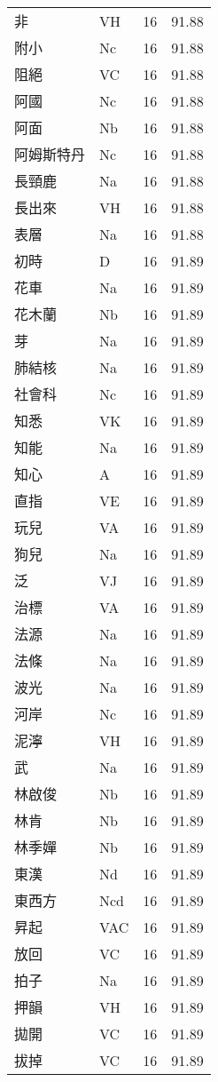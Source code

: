 \documentclass[twocolumn]{book}
\begin{document}
\begin{supertabular}{llrr}
非 & VH & 16 &  91.88\\
附小 & Nc & 16 &  91.88\\
阻絕 & VC & 16 &  91.88\\
阿國 & Nc & 16 &  91.88\\
阿面 & Nb & 16 &  91.88\\
阿姆斯特丹 & Nc & 16 &  91.88\\
長頸鹿 & Na & 16 &  91.88\\
長出來 & VH & 16 &  91.88\\
表層 & Na & 16 &  91.88\\
初時 & D & 16 &  91.89\\
花車 & Na & 16 &  91.89\\
花木蘭 & Nb & 16 &  91.89\\
芽 & Na & 16 &  91.89\\
肺結核 & Na & 16 &  91.89\\
社會科 & Nc & 16 &  91.89\\
知悉 & VK & 16 &  91.89\\
知能 & Na & 16 &  91.89\\
知心 & A & 16 &  91.89\\
直指 & VE & 16 &  91.89\\
玩兒 & VA & 16 &  91.89\\
狗兒 & Na & 16 &  91.89\\
泛 & VJ & 16 &  91.89\\
治標 & VA & 16 &  91.89\\
法源 & Na & 16 &  91.89\\
法條 & Na & 16 &  91.89\\
波光 & Na & 16 &  91.89\\
河岸 & Nc & 16 &  91.89\\
泥濘 & VH & 16 &  91.89\\
武 & Na & 16 &  91.89\\
林啟俊 & Nb & 16 &  91.89\\
林肯 & Nb & 16 &  91.89\\
林季嬋 & Nb & 16 &  91.89\\
東漢 & Nd & 16 &  91.89\\
東西方 & Ncd & 16 &  91.89\\
昇起 & VAC & 16 &  91.89\\
放回 & VC & 16 &  91.89\\
拍子 & Na & 16 &  91.89\\
押韻 & VH & 16 &  91.89\\
拋開 & VC & 16 &  91.89\\
拔掉 & VC & 16 &  91.89\\

\end{supertabular}
\end{document}
